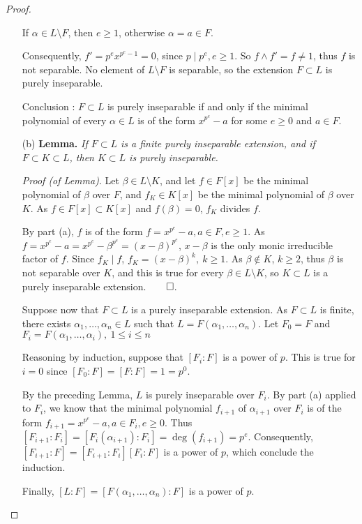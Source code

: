 \documentclass[11pt,a4paper]{article}
\begin{document}
\begin{proof}
\begin{enumerate}
If $\alpha \in L \setminus F$, then $e\geq 1$, otherwise $\alpha = a \in F$.

Consequently, $f' = p^e x^{p^e-1} =0$, since $p \mid p^e, e\geq 1$. So $f \wedge f' = f \neq 1$,  thus $f$ is not separable. No element of $L \setminus F$ is separable, so the extension $F \subset L$ is purely inseparable.

Conclusion : $F \subset L$ is purely inseparable if and only if the minimal polynomial of every $\alpha \in L$ is of the form $x^{p^e} -a$ for some $e\geq 0$ and $a\in F$.

\item[(b)]
{\bf Lemma.} {\it If $F \subset L$ is a finite purely inseparable extension,  and if $F \subset K \subset L$, then $K \subset L$ is purely inseparable.}

{\it Proof (of Lemma)}. Let $\beta \in L\setminus K$, and  let $f\in F[x]$ be the minimal polynomial of $\beta$ over $F$, and $f_K \in K[x]$ be the minimal polynomial of $\beta$ over $K$. As $f \in F[x] \subset K[x]$ and $f(\beta) = 0$, $f_K$ divides $f$.

By part (a), $f$ is of the form $f = x^{p^e} -a, a\in F, e\geq 1$. As $f = x^{p^e} - a = x^{p^e} - \beta^{p^e} = (x-\beta)^{p^e}$, $x-\beta$ is the only monic irreducible factor of $f$. Since $f_K \mid f$, $f_K = (x- \beta)^k,\ k\geq 1$. As $\beta \not \in K$, $k\geq 2$, thus $\beta$ is not separable over $K$, and this is true for every $\beta \in L \setminus K$, so $K \subset L$ is a purely inseparable extension.$\qed$.

\bigskip 

Suppose now that $F \subset L$ is a purely inseparable extension. As $F \subset L$ is finite, there exists $\alpha_1,\ldots,\alpha_n \in L$ such that $L = F(\alpha_1,\ldots,\alpha_n)$. Let $F_0 = F$ and $F_i = F(\alpha_1, \ldots,\alpha_i),\ 1\leq i \leq n$

Reasoning by induction, suppose that $[F_i : F]$ is a power of $p$. This is true for $i=0$ since $[F_0:F] = [F:F] = 1 = p^0$.

By the preceding Lemma, $L$ is purely inseparable over $F_i$. By part (a) applied to $F_i$, we know that the minimal polynomial $f_{i+1}$ of $\alpha_{i+1}$ over $F_i$ is of the form $f_{i+1} = x^{p^e} -a, a\in F_i, e\geq 0$. Thus $[F_{i+1} : F_i] = [F_{i}(\alpha_{i+1}) : F_i] = \deg(f_{i+1}) = p^e$. Consequently, $[F_{i+1}:F] = [F_{i+1}:F_i][F_i:F] $ is a power of $p$, which conclude the induction.

Finally, $[L:F] = [F(\alpha_1,\ldots,\alpha_n) : F]$ is a power of $p$.
\end{enumerate}
\end{proof}
\end{document}
